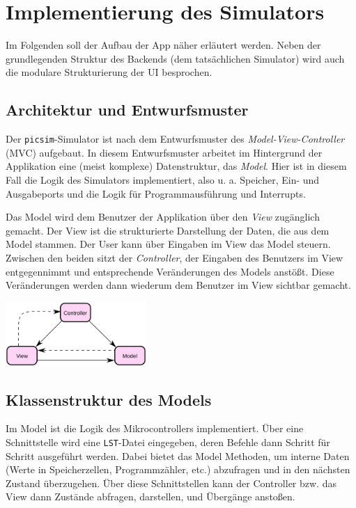 \documentclass[a4paper]{article}
\begin{document}
\section{Implementierung des Simulators}

Im Folgenden soll der Aufbau der App näher erläutert werden.
Neben der grundlegenden Struktur des Backends (dem tatsächlichen Simulator) wird auch die modulare Strukturierung der UI besprochen.

\subsection{Architektur und Entwurfsmuster}

Der \texttt{picsim}-Simulator ist nach dem Entwurfsmuster des \textit{Model-View-Controller} (MVC) aufgebaut.
In diesem Entwurfsmuster arbeitet im Hintergrund der Applikation eine (meist komplexe) Datenstruktur, das \textit{Model}.
Hier ist in diesem Fall die Logik des Simulators implementiert, also u. a. Speicher, Ein- und Ausgabeports und die Logik für Programmausführung und Interrupts.

Das Model wird dem Benutzer der Applikation über den \textit{View} zugänglich gemacht.
Der View ist die strukturierte Darstellung der Daten, die aus dem Model stammen.
Der User kann über Eingaben im View das Model steuern.
Zwischen den beiden sitzt der \textit{Controller}, der Eingaben des Benutzers im View entgegennimmt und entsprechende Veränderungen des Models anstößt.
Diese Veränderungen werden dann wiederum dem Benutzer im View sichtbar gemacht.

\begin{center}
    \includegraphics[width=0.4\textwidth]{img/mvcdiag}
\end{center}

\subsection{Klassenstruktur des Models}

Im Model ist die Logik des Mikrocontrollers implementiert.
Über eine Schnittstelle wird eine \texttt{LST}-Datei eingegeben, deren Befehle dann Schritt für Schritt ausgeführt werden.
Dabei bietet das Model Methoden, um interne Daten (Werte in Speicherzellen, Programmzähler, etc.) abzufragen und in den nächsten Zustand überzugehen.
Über diese Schnittstellen kann der Controller bzw. das View dann Zustände abfragen, darstellen, und Übergänge anstoßen.
\end{document}
